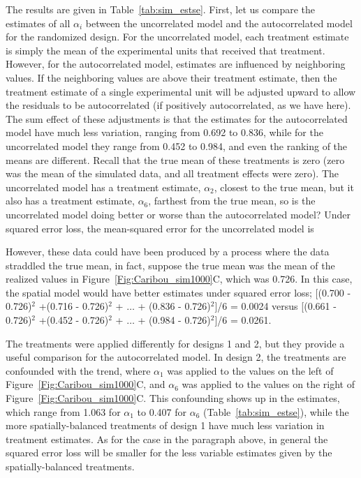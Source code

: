 \documentclass[12pt, titlepage]{article}
\begin{document}
The results are given in Table~\ref{tab:sim_estse}.  First, let us compare the estimates of all $\alpha_{i}$ between the uncorrelated model and the autocorrelated model for the randomized design.  For the uncorrelated model, each treatment estimate is simply the mean of the experimental units that received that treatment.  However, for the autocorrelated model, estimates are influenced by neighboring values.  If the neighboring values are above their treatment estimate, then the treatment estimate of a single experimental unit will be adjusted upward to allow the residuals to be autocorrelated (if positively autocorrelated, as we have here).  The sum effect of these adjustments is that the estimates for the autocorrelated model have much less variation, ranging from 0.692 to 0.836, while for the uncorrelated model they range from 0.452 to 0.984, and even the ranking of the means are different.  Recall that the true mean of these treatments is zero (zero was the mean of the simulated data, and all treatment effects were zero).  The uncorrelated model has a treatment estimate, $\alpha_{2}$, closest to the true mean, but it also has a treatment estimate, $\alpha_{6}$, farthest from the true mean, so is the uncorrelated model doing better or worse than the autocorrelated model?  Under squared error loss, the mean-squared error for the uncorrelated model is 

However, these data could have been produced by a process where the data straddled the true mean, in fact, suppose the true mean was the mean of the realized values in Figure~\ref{Fig:Caribou_sim1000}C, which was 0.726.  In this case, the spatial model would have better estimates under squared error loss; [(0.700 - 0.726)$^{2}$ +(0.716 - 0.726)$^{2}$ + $\ldots$ + (0.836 - 0.726)$^{2}$]/6 = 0.0024 versus [(0.661 - 0.726)$^{2}$ +(0.452 - 0.726)$^{2}$ + $\ldots$ + (0.984 - 0.726)$^{2}$]/6 = 0.0261.

The treatments were applied differently for designs 1 and 2, but they provide a useful comparison for the autocorrelated model. In design 2, the treatments are confounded with the trend, where $\alpha_{1}$ was applied to the values on the left of Figure~\ref{Fig:Caribou_sim1000}C, and $\alpha_{6}$ was applied to the values on the right of Figure~\ref{Fig:Caribou_sim1000}C.  This confounding shows up in the estimates, which range from 1.063 for $\alpha_{1}$ to 0.407 for $\alpha_{6}$ (Table~\ref{tab:sim_estse}), while the more spatially-balanced treatments of design 1 have much less variation in treatment estimates.  As for the case in the paragraph above, in general the squared error loss will be smaller for the less variable estimates given by the spatially-balanced treatments.
\end{document}
